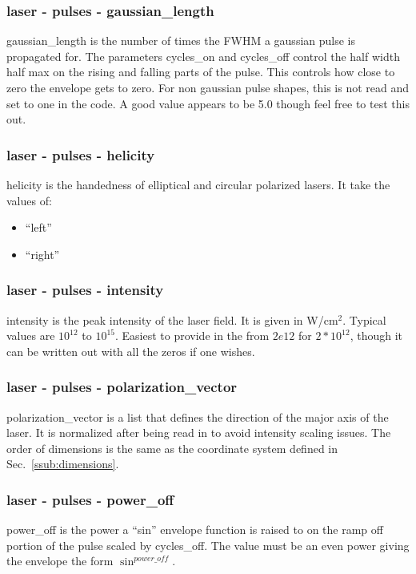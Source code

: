 \documentclass{article}
\begin{document}
\subsubsection{laser - pulses - gaussian\_length}
gaussian\_length is the number of times the FWHM a gaussian pulse is propagated for. The parameters cycles\_on and cycles\_off control the half width half max on the rising and falling parts of the pulse. This controls how close to zero the envelope gets to zero. For non gaussian pulse shapes, this is not read and set to one in the code. A good value appears to be 5.0 though feel free to test this out.

\subsubsection{laser - pulses - helicity}
helicity is the handedness of elliptical and circular polarized lasers. It take the values of:
\begin{itemize}
  \item ``left''
  \item ``right''
\end{itemize}

\subsubsection{laser - pulses - intensity}
intensity is the peak intensity of the laser field. It is given in W/cm$^2$. Typical values are $10^{12}$ to $10^{15}$. Easiest to provide in the from $2e12$ for $2*10^{12}$, though it can be written out with all the zeros if one wishes.

\subsubsection{laser - pulses - polarization\_vector}
polarization\_vector is a list that defines the direction of the major axis of the laser. It is normalized after being read in to avoid intensity scaling issues. The order of dimensions is the same as the coordinate system defined in Sec.~\ref{ssub:dimensions}.

\subsubsection{laser - pulses - power\_off}
power\_off is the power a ``sin'' envelope function is raised to on the ramp off portion of the pulse scaled by cycles\_off. The value must be an even power giving the envelope the form $\sin^{power\_off}$.
\end{document}
